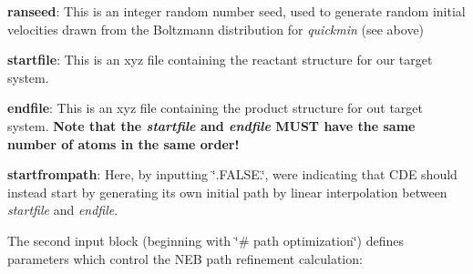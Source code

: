 \begin{DoxyItemize}
\item {\bfseries ranseed}\+: This is an integer random number seed, used to generate random initial velocities drawn from the Boltzmann distribution for {\itshape quickmin} (see above)
\item {\bfseries startfile}\+: This is an xyz file containing the reactant structure for our target system.
\item {\bfseries endfile}\+: This is an xyz file containing the product structure for out target system. {\bfseries Note that the {\itshape startfile} and {\itshape endfile} M\+U\+ST have the same number of atoms in the same order!}
\item {\bfseries startfrompath}\+: Here, by inputting \char`\"{}.\+F\+A\+L\+S\+E.\char`\"{}, we\textquotesingle{}re indicating that C\+DE should instead start by generating its own initial path by linear interpolation between {\itshape startfile} and {\itshape endfile}.
\end{DoxyItemize}

The second input block (beginning with \char`\"{}\# path optimization\char`\"{}) defines parameters which control the N\+EB path refinement calculation\+:


